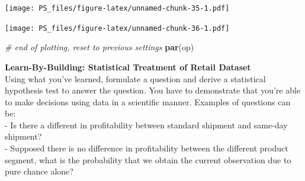 \documentclass[]{article}
\newenvironment{Shaded}{\begin{snugshade}}{\end{snugshade}}
\newcommand{\CommentTok}[1]{\textcolor[rgb]{0.56,0.35,0.01}{\textit{#1}}}
\newcommand{\DataTypeTok}[1]{\textcolor[rgb]{0.13,0.29,0.53}{#1}}
\newcommand{\DecValTok}[1]{\textcolor[rgb]{0.00,0.00,0.81}{#1}}
\newcommand{\KeywordTok}[1]{\textcolor[rgb]{0.13,0.29,0.53}{\textbf{#1}}}
\newcommand{\NormalTok}[1]{#1}
\newcommand{\OperatorTok}[1]{\textcolor[rgb]{0.81,0.36,0.00}{\textbf{#1}}}
\newcommand{\StringTok}[1]{\textcolor[rgb]{0.31,0.60,0.02}{#1}}
\begin{document}
\texttt{[image: PS\_files/figure-latex/unnamed-chunk-35-1.pdf]}

\begin{Shaded}
\end{Shaded}

\texttt{[image: PS\_files/figure-latex/unnamed-chunk-36-1.pdf]}

\begin{Shaded}
\begin{Highlighting}[]
\CommentTok{# end of plotting, reset to previous settings}
\KeywordTok{par}\NormalTok{(op)}
\end{Highlighting}
\end{Shaded}

\textbf{Learn-By-Building: Statistical Treatment of Retail Dataset}\\
Using what you've learned, formulate a question and derive a statistical
hypothesis test to answer the question. You have to demonstrate that
you're able to make decisions using data in a scientific manner.
Examples of questions can be:\\
- Is there a different in profitability between standard shipment and
same-day shipment?\\
- Supposed there is no difference in profitability between the different
product segment, what is the probability that we obtain the current
observation due to pure chance alone?
\end{document}
